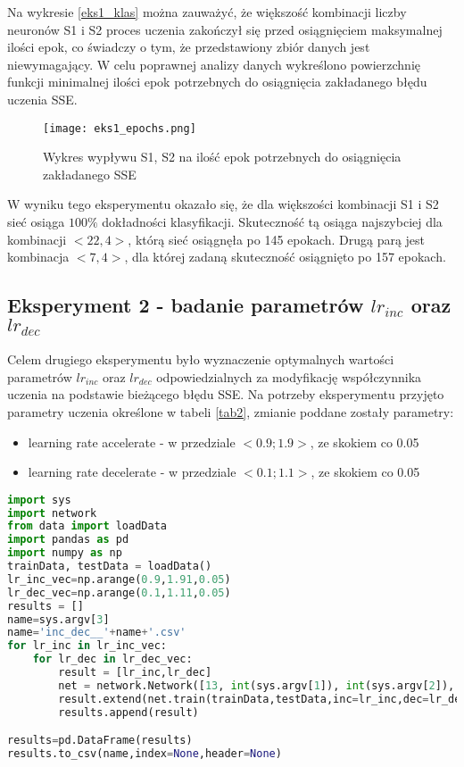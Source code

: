 \documentclass[12pt,twoside]{article}
\begin{document}
Na wykresie \ref{eks1_klas} można zauważyć, że większość kombinacji liczby neuronów S1 i S2 proces uczenia zakończył się przed osiągnięciem maksymalnej ilości epok, co świadczy o tym, że przedstawiony zbiór danych jest niewymagający. W celu poprawnej analizy danych wykreślono powierzchnię funkcji minimalnej ilości epok potrzebnych do osiągnięcia zakładanego błędu uczenia SSE.
\clearpage
\begin{figure}[H]
\label{eks1_epochs}
\centering
\texttt{[image: eks1\_epochs.png]}
\caption{Wykres wypływu S1, S2 na ilość epok potrzebnych do osiągnięcia zakładanego SSE}
\end{figure}

W wyniku tego eksperymentu okazało się, że dla większości kombinacji S1 i S2 sieć osiąga $100\%$ dokładności klasyfikacji. Skuteczność tą osiąga najszybciej dla kombinacji $<22,4>$, którą sieć osiągnęła po 145 epokach. Drugą parą jest kombinacja $<7,4>$, dla której zadaną skuteczność osiągnięto po 157 epokach.



\subsection{Eksperyment 2 - badanie parametrów $lr_{inc}$ oraz $lr_{dec}$}
Celem drugiego eksperymentu było wyznaczenie optymalnych wartości parametrów $lr_{inc}$ oraz $lr_{dec}$ odpowiedzialnych za modyfikację współczynnika uczenia na podstawie bieżącego błędu SSE. Na potrzeby eksperymentu przyjęto parametry uczenia określone w tabeli \ref{tab2}, zmianie poddane zostały parametry:
\begin{itemize}
\item learning rate accelerate - w przedziale $< 0.9; 1.9 >$, ze skokiem co 0.05
\item learning rate decelerate - w przedziale $< 0.1; 1.1 >$, ze skokiem co 0.05
\end{itemize}


\begin{lstlisting}[language=Python,caption=Algorytm realizujący eksperyment 2,label={eks2}]
import sys
import network
from data import loadData
import pandas as pd
import numpy as np
trainData, testData = loadData()
lr_inc_vec=np.arange(0.9,1.91,0.05)
lr_dec_vec=np.arange(0.1,1.11,0.05)
results = []
name=sys.argv[3]
name='inc_dec__'+name+'.csv'
for lr_inc in lr_inc_vec:
	for lr_dec in lr_dec_vec:
		result = [lr_inc,lr_dec]
		net = network.Network([13, int(sys.argv[1]), int(sys.argv[2]), 3])
		result.extend(net.train(trainData,testData,inc=lr_inc,dec=lr_dec))
		results.append(result)

results=pd.DataFrame(results)
results.to_csv(name,index=None,header=None)


\end{lstlisting}
\end{document}
